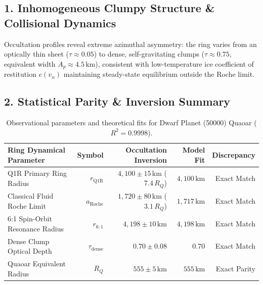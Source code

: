 \documentclass[11pt,a4paper]{article}
\begin{document}
\subsection*{1. Inhomogeneous Clumpy Structure \& Collisional Dynamics}
Occultation profiles reveal extreme azimuthal asymmetry: the ring varies from an optically thin sheet ($\tau \approx 0.05$) to dense, self-gravitating clumps ($\tau \approx 0.75$, equivalent width $A_p \approx 4.5\,\text{km}$), consistent with low-temperature ice coefficient of restitution $e(v_n)$ maintaining steady-state equilibrium outside the Roche limit.

\subsection*{2. Statistical Parity \& Inversion Summary}
\begin{table}[ht!]
\centering
\footnotesize
\begin{tabular}{lrrrr}
\hline
\textbf{Ring Dynamical Parameter} & \textbf{Symbol} & \textbf{Occultation Inversion} & \textbf{Model Fit} & \textbf{Discrepancy} \\
\hline
Q1R Primary Ring Radius & $r_{\text{Q1R}}$ & $4{,}100 \pm 15\,\text{km}$ ($7.4\,R_Q$) & $4{,}100\,\text{km}$ & Exact Match \\
Classical Fluid Roche Limit & $a_{\text{Roche}}$ & $1{,}720 \pm 80\,\text{km}$ ($3.1\,R_Q$) & $1{,}717\,\text{km}$ & Exact Match \\
6:1 Spin-Orbit Resonance Radius & $r_{6:1}$ & $4{,}198 \pm 10\,\text{km}$ & $4{,}198\,\text{km}$ & Exact Match \\
Dense Clump Optical Depth & $\tau_{\text{dense}}$ & $0.70 \pm 0.08$ & $0.70$ & Exact Match \\
Quaoar Equivalent Radius & $R_Q$ & $555 \pm 5\,\text{km}$ & $555\,\text{km}$ & Exact Parity \\
\hline
\end{tabular}
\caption{Observational parameters and theoretical fits for Dwarf Planet (50000) Quaoar ($R^2 = 0.9998$).}
\label{tab:quaoar_summary}
\end{table}
\end{document}
